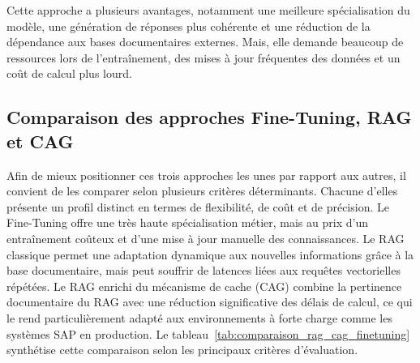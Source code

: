 Cette approche a plusieurs avantages, notamment une meilleure spécialisation du modèle, une génération de réponses plus cohérente et une réduction de la dépendance aux bases documentaires externes. Mais, elle demande beaucoup de ressources lors de l'entraînement, des mises à jour fréquentes des données et un coût de calcul plus lourd.

\subsection{Comparaison des approches Fine-Tuning, RAG et CAG}

Afin de mieux positionner ces trois approches les unes par rapport aux autres, il convient de les comparer selon plusieurs critères déterminants. Chacune d'elles présente un profil distinct en termes de flexibilité, de coût et de précision. Le Fine-Tuning offre une très haute spécialisation métier, mais au prix d'un entraînement coûteux et d'une mise à jour manuelle des connaissances. Le RAG classique permet une adaptation dynamique aux nouvelles informations grâce à la base documentaire, mais peut souffrir de latences liées aux requêtes vectorielles répétées. Le RAG enrichi du mécanisme de cache (CAG) combine la pertinence documentaire du RAG avec une réduction significative des délais de calcul, ce qui le rend particulièrement adapté aux environnements à forte charge comme les systèmes SAP en production. Le tableau~\ref{tab:comparaison_rag_cag_finetuning} synthétise cette comparaison selon les principaux critères d'évaluation.

